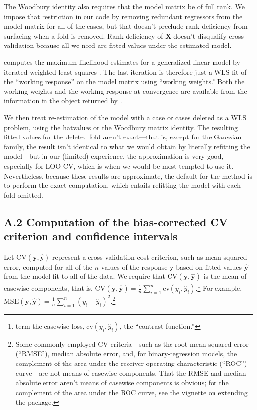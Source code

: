 \documentclass[
]{jss}
\begin{document}
The Woodbury identity also requires that the model matrix be of full
rank. We impose that restriction in our code by removing redundant
regressors from the model matrix for all of the cases, but that doesn't
preclude rank deficiency from surfacing when a fold is removed. Rank
deficiency of \(\mathbf{X}\) doesn't disqualify cross-validation because
all we need are fitted values under the estimated model.

 computes the maximum-likelihood estimates for a generalized
linear model by iterated weighted least squares \citep[see, e.g.,][Sec.~6.12]{FoxWeisberg:2019}.
The last iteration is therefore just a WLS fit
of the ``working response'' on the model matrix using ``working
weights.'' Both the working weights and the working response at
convergence are available from the information in the object returned by
.

We then treat re-estimation of the model with a case or cases deleted as
a WLS problem, using the hatvalues or the Woodbury matrix identity. The
resulting fitted values for the deleted fold aren't exact---that is,
except for the Gaussian family, the result isn't identical to what we
would obtain by literally refitting the model---but in our (limited)
experience, the approximation is very good, especially for LOO CV, which
is when we would be most tempted to use it. Nevertheless, because these
results are approximate, the default for the  
method is to perform the exact computation, which entails refitting the
model with each fold omitted.

\subsection*{A.2 Computation of the bias-corrected CV criterion and
confidence
intervals}\label{a.2-computation-of-the-bias-corrected-cv-criterion-and-confidence-intervals}

Let \(\mathrm{CV}(\mathbf{y}, \widehat{\mathbf{y}})\) represent a
cross-validation cost criterion, such as mean-squared error, computed
for all of the \(n\) values of the response \(\mathbf{y}\) based on
fitted values \(\widehat{\mathbf{y}}\) from the model fit to all of the
data. We require that \(\mathrm{CV}(\mathbf{y}, \widehat{\mathbf{y}})\)
is the mean of casewise components, that is,
\(\mathrm{CV}(\mathbf{y}, \widehat{\mathbf{y}}) = \frac{1}{n}\sum_{i=1}^n\mathrm{cv}(y_i, \widehat{y}_i)\).\footnote{\citet{ArlotCelisse:2010}
  term the casewise loss, \(\mathrm{cv}(y_i, \widehat{y}_i)\), the
  ``contrast function.''} For example,
\(\mathrm{MSE}(\mathbf{y}, \widehat{\mathbf{y}}) = \frac{1}{n}\sum_{i=1}^n (y_i - \widehat{y}_i)^2\).\footnote{Some
  commonly employed CV criteria---such as the root-mean-squared error
  (``RMSE''), median absolute error, and, for binary-regression models,
  the complement of the area under the receiver operating characteristic
  (``ROC'') curve---are not means of casewise components. That the RMSE
  and median absolute error aren't means of casewise components is
  obvious; for the complement of the area under the ROC curve, see the
  vignette on extending the  package.}
\end{document}
